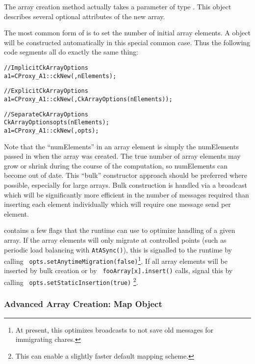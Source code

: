 \label{CkArrayOptions}

The array creation method  actually takes a parameter
of type .  This object describes several
optional attributes of the new array.

The most common form of  is to set the number
of initial array elements.  A  object will be 
constructed automatically in this special common case.  Thus
the following code segments all do exactly the same thing:

\begin{alltt}
//Implicit CkArrayOptions
  a1=CProxy_A1::ckNew(,nElements);

//Explicit CkArrayOptions
  a1=CProxy_A1::ckNew(,CkArrayOptions(nElements));

//Separate CkArrayOptions
  CkArrayOptions opts(nElements);
  a1=CProxy_A1::ckNew(,opts);
\end{alltt}

Note that the ``numElements'' in an array element is simply the
numElements passed in when the array was created.  The true number of
array elements may grow or shrink during the course of the
computation, so numElements can become out of date.  This ``bulk''
constructor approach should be preferred where possible, especially
for large arrays.  Bulk construction is handled via a broadcast which
will be significantly more efficient in the number of messages
required than inserting each element individually which will require
one message send per element.

 contains a few flags that the runtime can use to
optimize handling of a given array. If the array elements will only
migrate at controlled points (such as periodic load balancing with
{\tt AtASync()}), this is signalled to the runtime by calling {\tt
  opts.setAnytimeMigration(false)}\footnote{At present, this optimizes
broadcasts to not save old messages for immigrating chares.}. If all
array elements will be inserted by bulk creation or by {\tt
  fooArray[x].insert()} calls, signal this by calling {\tt
  opts.setStaticInsertion(true)} \footnote{This can enable a slightly
  faster default mapping scheme.}.

\subsubsection{Advanced Array Creation: Map Object}


